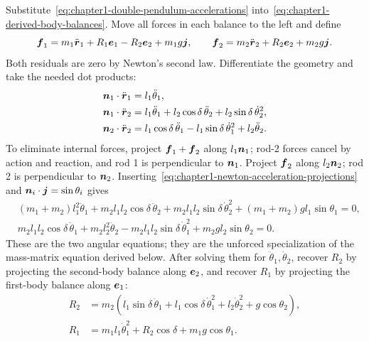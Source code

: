 \documentclass[../main.tex]{subfiles}
\begin{document}
Substitute~\eqref{eq:chapter1-double-pendulum-accelerations} into~\eqref{eq:chapter1-derived-body-balances}. Move all forces in each balance to the left and define
\begin{equation}
\boldsymbol{f}_1=m_1\ddot{\boldsymbol{r}}_1+R_1\boldsymbol{e}_1-R_2\boldsymbol{e}_2+m_1g\boldsymbol{j},
\qquad
\boldsymbol{f}_2=m_2\ddot{\boldsymbol{r}}_2+R_2\boldsymbol{e}_2+m_2g\boldsymbol{j}.
\label{eq:chapter1-newton-residual-definition}
\end{equation}
Both residuals are zero by Newton's second law. Differentiate the geometry and take the needed dot products:
\begin{equation}
\begin{aligned}
\boldsymbol{n}_1\cdot\ddot{\boldsymbol{r}}_1&=l_1\ddot\theta_1,\\
\boldsymbol{n}_1\cdot\ddot{\boldsymbol{r}}_2&=l_1\ddot\theta_1+l_2\cos\delta\,\ddot\theta_2
+l_2\sin\delta\,\dot\theta_2^2,\\
\boldsymbol{n}_2\cdot\ddot{\boldsymbol{r}}_2&=l_1\cos\delta\,\ddot\theta_1
-l_1\sin\delta\,\dot\theta_1^2+l_2\ddot\theta_2.
\end{aligned}
\label{eq:chapter1-newton-acceleration-projections}
\end{equation}
To eliminate internal forces, project $\boldsymbol{f}_1+\boldsymbol{f}_2$ along $l_1\boldsymbol{n}_1$; rod-2 forces cancel by action and reaction, and rod 1 is perpendicular to $\boldsymbol{n}_1$. Project $\boldsymbol{f}_2$ along $l_2\boldsymbol{n}_2$; rod 2 is perpendicular to $\boldsymbol{n}_2$. Inserting~\eqref{eq:chapter1-newton-acceleration-projections} and $\boldsymbol{n}_i\cdot\boldsymbol{j}=\sin\theta_i$ gives
\begin{equation}
\begin{aligned}
&(m_1+m_2)l_1^2\ddot\theta_1+m_2l_1l_2\cos\delta\,\ddot\theta_2
+m_2l_1l_2\sin\delta\,\dot\theta_2^2
+(m_1+m_2)gl_1\sin\theta_1=0,\\
&m_2l_1l_2\cos\delta\,\ddot\theta_1+m_2l_2^2\ddot\theta_2
-m_2l_1l_2\sin\delta\,\dot\theta_1^2
+m_2gl_2\sin\theta_2=0.
\end{aligned}
\label{eq:chapter1-newton-projected-equations}
\end{equation}
These are the two angular equations; they are the unforced specialization of the mass-matrix equation derived below. After solving them for $\ddot\theta_1,\ddot\theta_2$, recover $R_2$ by projecting the second-body balance along $\boldsymbol{e}_2$, and recover $R_1$ by projecting the first-body balance along $\boldsymbol{e}_1$:
\begin{equation}
\begin{aligned}
R_2&=m_2\left(l_1\sin\delta\,\ddot\theta_1
+l_1\cos\delta\,\dot\theta_1^2+l_2\dot\theta_2^2+g\cos\theta_2\right),\\
R_1&=m_1l_1\dot\theta_1^2+R_2\cos\delta+m_1g\cos\theta_1.
\end{aligned}
\label{eq:chapter1-newton-radial-reactions}
\end{equation}
\end{document}
